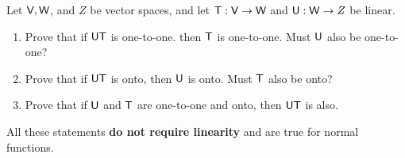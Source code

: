 \begin{exercise} \label{exercise 2.3.12}
Let \(\textsf{V}, \textsf{W}\), and \(Z\) be vector spaces, and let \(\textsf{T} : \textsf{V} \to \textsf{W}\) and \(\textsf{U}: \textsf{W} \to Z\) be linear.
\begin{enumerate}
\item Prove that if \(\textsf{U}\textsf{T}\) is one-to-one. then \(\textsf{T}\) is one-to-one.
    Must \(\textsf{U}\) also be one-to-one?
\item Prove that if \(\textsf{U}\textsf{T}\) is onto, then \(\textsf{U}\) is onto.
    Must \(\textsf{T}\) also be onto?
\item Prove that if \(\textsf{U}\) and \(\textsf{T}\) are one-to-one and onto, then \(\textsf{U}\textsf{T}\) is also.
\end{enumerate}
\end{exercise}

\begin{note}
All these statements \textbf{do not require linearity} and are true for normal functions.
\end{note}

